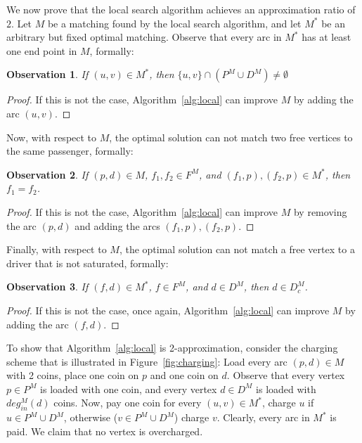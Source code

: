 \documentclass[draft]{article}
\newtheorem{observation}{Observation}
\newcommand{\din}[1][M]{deg^M_{in}}
\begin{document}
We now prove that the local search algorithm achieves an approximation ratio of $2$.
Let $M$ be a matching found by the local search algorithm, 
and let $M^*$ be an arbitrary but fixed optimal matching.
Observe that every arc in $M^*$ has at least one end point in $M$, formally: 
\begin{observation}
If $(u,v) \in M^*$, then $\{u,v\} \cap (P^M \cup D^M) \neq \emptyset$
\end{observation}

\begin{proof}
If this is not the case, Algorithm~\ref{alg:local} can improve $M$
by adding the arc $(u,v)$.  
\end{proof}

Now, with respect to $M$, the optimal solution can not match two free vertices to the same
passenger, formally:
\begin{observation}
\label{observation:one-free}
If $(p,d) \in M$, $f_1, f_2 \in F^M$, and $(f_1, p), (f_2, p) \in M^*$, then $f_1 = f_2$.
\end{observation}

\begin{proof}
If this is not the case, Algorithm~\ref{alg:local} can improve $M$ 
by removing the arc $(p,d)$ and adding the arcs $(f_1, p), (f_2, p)$.
\end{proof}

Finally, with respect to $M$, the optimal solution can not match a free vertex to a driver
that is not saturated, formally: 
\begin{observation}
\label{observation:saturated}
If $(f,d) \in M^*$, $f \in F^M$, and $d \in D^M$, then $d \in D^M_c$.
\end{observation}

\begin{proof}
If this is not the case, once again, Algorithm~\ref{alg:local} can improve $M$
by adding the arc $(f,d)$.
\end{proof}

To show that Algorithm~\ref{alg:local} is 2-approximation, 
consider the charging scheme that is illustrated in Figure~\ref{fig:charging}:
Load every arc $(p,d) \in M$ with 2 coins, 
place one coin on $p$ and one coin on $d$.
Observe that every vertex $p \in P^M$ is loaded with one coin, 
and every vertex $d \in D^M$ is loaded with $\din(d)$ coins.   
Now, pay one coin for every $(u,v) \in M^*$, charge $u$ if $u \in P^M \cup D^M$, 
otherwise ($v \in P^M \cup D^M$) charge $v$.
Clearly, every arc in $M^*$ is paid.
We claim that no vertex is overcharged.
\end{document}
